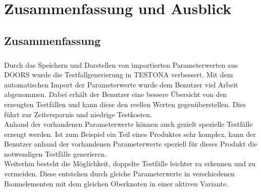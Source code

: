 \chapter{Zusammenfassung und Ausblick}\label{chp:zusammenfassung}



\newpage
\section{Zusammenfassung}
\paragraph{}

Durch das Speichern und Darstellen von importierten Parameterwerten aus DOORS wurde die Testfallgenerierung in TESTONA verbessert. Mit dem automatischen Import der Parameterwerte wurde dem Benutzer viel Arbeit abgenommen. Dabei erhält der Benutzer eine bessere Übersicht von den erzeugten Testfällen und kann diese den reellen Werten gegenüberstellen. Dies führt zur Zeitersparnis und niedrige Testkosten.\\


Anhand der vorhandenen Parameterwerte können auch gezielt spezielle Testfälle erzeugt werden. Ist zum Beispiel ein Teil eines Produktes sehr komplex, kann der Benutzer anhand der vorhandenen Parameterwerte speziell für dieses Produkt die notwendigen Testfälle generieren.\\


Weiterhin besteht die Möglichkeit, doppelte Testfälle leichter zu erkennen und zu vermeiden. Diese entstehen durch gleiche Parameterwerte in verschiedenen Baumelementen mit dem gleichen Oberknoten in einer aktiven Variante.\\


\newpage
